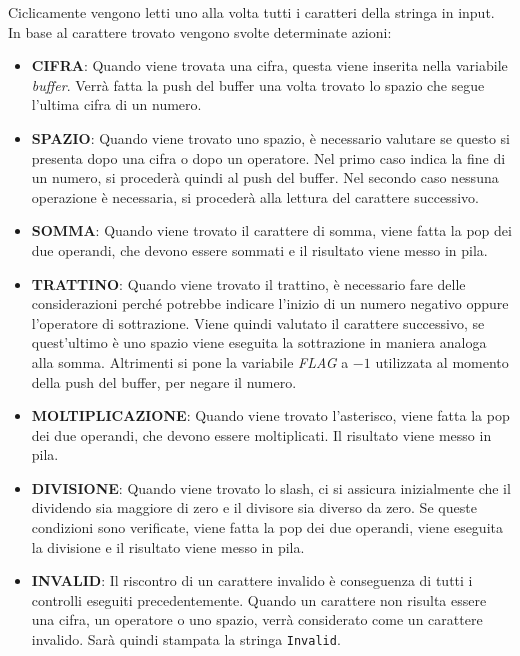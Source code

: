 \documentclass[a4paper,11pt,oneside]{book}
\begin{document}
Ciclicamente vengono letti uno alla volta tutti i caratteri della stringa in input. In base al carattere trovato vengono svolte determinate azioni:
\begin{itemize}
  \item \textbf{CIFRA}: Quando viene trovata una cifra, questa viene inserita nella variabile \emph{buffer}. Verrà fatta la push del buffer una volta trovato lo spazio che segue 
  l'ultima cifra di un numero.

  \item \textbf{SPAZIO}: Quando viene trovato uno spazio, è necessario valutare se questo si presenta dopo una cifra o dopo un operatore. Nel primo caso indica la fine di un numero,
  si procederà quindi al push del buffer. Nel secondo caso nessuna operazione è necessaria, si procederà alla lettura del carattere successivo.

  \item \textbf{SOMMA}: Quando viene trovato il carattere di somma, viene fatta la pop dei due operandi, che devono essere sommati e il risultato viene messo in pila.

  \item \textbf{TRATTINO}: Quando viene trovato il trattino, è necessario fare delle considerazioni perché potrebbe indicare l'inizio di un numero negativo oppure l'operatore di sottrazione.
  Viene quindi valutato il carattere successivo, se quest'ultimo è uno spazio viene eseguita la sottrazione in maniera analoga alla somma. Altrimenti si pone la 
  variabile \emph{FLAG} a $-1$ utilizzata al momento della push del buffer, per negare il numero.

  \item \textbf{MOLTIPLICAZIONE}: Quando viene trovato l'asterisco, viene fatta la pop dei due operandi, che devono essere moltiplicati. Il risultato viene messo in pila.

  \item \textbf{DIVISIONE}: Quando viene trovato lo slash, ci si assicura inizialmente che il dividendo sia maggiore di zero e il divisore sia diverso da zero. Se queste condizioni
  sono verificate, viene fatta la pop dei due operandi, viene eseguita la divisione e il risultato viene messo in pila.

  \item \textbf{INVALID}: Il riscontro di un carattere invalido è conseguenza di tutti i controlli eseguiti precedentemente. Quando un carattere non risulta essere 
  una cifra, un operatore o uno spazio, verrà considerato come un carattere invalido. Sarà quindi stampata la stringa \verb|Invalid|.
\end{itemize}
\end{document}

